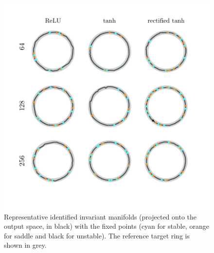 \documentclass{article} %
\newcounter{ct}
\theoremstyle{definition}
\theoremstyle{remark}
\begin{document}
 \begin{figure}[tbhp]
     \centering
    \includegraphics[width=\textwidth]{im_all_last2}
       \caption{Representative identified invariant manifolds (projected onto the output space, in black) with the fixed points (cyan for stable, orange for saddle and black for unstable).
        The reference target ring is shown in grey.}\label{fig:im_rep}
\end{figure}
\end{document}
